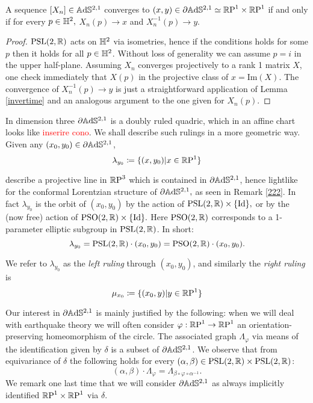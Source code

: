 \begin{lemma}\label{convergenza}
    A sequence $[X_n]\in\A^{2,1}$ converges to $(x,y)\in\partial\A^{2,1}\simeq\T$ if and only if for every $p\in\H^2,$ $X_n(p)\to x$ and $X_n^{-1}(p)\to y.$ 
\end{lemma}
\begin{proof}
    $\PSL$ acts on $\H^2$ via isometries, hence if the conditions holds for some $p$ then it holds for all $p\in\H^2$. Without loss of generality we can assume $p=i$ in the upper half-plane. Assuming $X_n$ converges projectively to a rank 1 matrix $X$, one check immediately that $X(p)$ in the projective class of $x=\text{Im}(X).$ The convergence of $X_n^{-1}(p)\to y$ is just a straightforward application of Lemma \ref{invertime} and an analogous argument to the one given for $X_n(p)$.
\end{proof}

In dimension three $\partial\A^{2,1}$ is a doubly ruled quadric, which in an affine chart looks like \textcolor{red}{inserire cono}. We shall describe such rulings in a more geometric way. Given any $(x_0,y_0)\in\partial\A^{2,1}$, 
\begin{equation}\label{ruling}
        \lambda_{y_0}\coloneqq\{(x,y_0)|x\in\R\text{P}^1\}
\end{equation}

describe a projective line in $\R\text{P}^3$ which is contained in $\partial\A^{2,1}$, hence lightlike for the conformal Lorentzian structure of $\partial\A^{2,1},$ as seen in Remark \ref{222}. In fact $\lambda_{y_0}$ is the orbit of $(x_0,y_0)$ by the action of $\PSL\times\{\text{Id}\},$ or by the (now free) action of $\text{PSO}(2,\R)\times\{\text{Id}\}.$ Here $\text{PSO}(2,\R)$ corresponds to a 1-parameter elliptic subgroup in $\PSL$. In short: 
\[
    \lambda_{y_0}=\PSL\cdot(x_0,y_0)=\text{PSO}(2,\R)\cdot(x_0,y_0).
\]

We refer to $\lambda_{y_0}$ as the \textit{left ruling} through $(x_0,y_0)$, and similarly the \textit{right ruling} is 
\[
    \mu_{x_0}\coloneqq\{(x_0,y)|y\in\R\text{P}^1\}
\]

Our interest in $\partial\A^{2,1}$ is mainly justified by the following: when we will deal with earthquake theory we will often consider $\varphi:\S\to\S$ an orientation-preserving homeomorphism of the circle. The associated graph $\Lambda_\varphi$ via means of the identification given by $\delta$ is a subset of $\partial\A^{2,1}$. We observe that from equivariance of $\delta$ the following holds for every $(\alpha,\beta)\in\PSL\times\PSL$: 
\begin{equation}\label{graphequivariancy}
(\alpha,\beta)\cdot\Lambda_\varphi=\Lambda_{\beta\circ\varphi\circ\alpha^{-1}}.
\end{equation}
We remark one last time that we will consider $\partial\A^{2,1}$ as always implicitly identified $\T$ via $\delta$.

